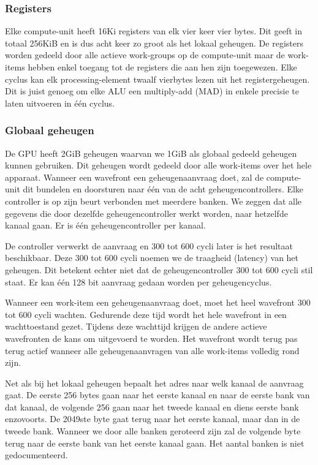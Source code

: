 \subsubsection{Registers}
Elke compute-unit heeft 16Ki registers van elk vier keer vier bytes. Dit geeft in totaal 256KiB en is dus acht keer zo groot als het lokaal geheugen. De registers worden gedeeld door alle actieve work-groups op de compute-unit maar de work-items hebben enkel toegang tot de registers die aan hen zijn toegewezen. Elke cyclus kan elk processing-element twaalf vierbytes lezen uit het registergeheugen. Dit is juist genoeg om elke ALU een multiply-add (MAD) in enkele precisie te laten uitvoeren in \'e\'en cyclus.

\subsubsection{Globaal geheugen}
De GPU heeft 2GiB geheugen waarvan we 1GiB als globaal gedeeld geheugen kunnen gebruiken. Dit geheugen wordt gedeeld door alle work-items over het hele apparaat. Wanneer een wavefront een geheugenaanvraag doet, zal de compute-unit dit bundelen en doorsturen naar \'e\'en van de acht geheugencontrollers. Elke controller is op zijn beurt verbonden met meerdere banken. We zeggen dat alle gegevens die door dezelfde geheugencontroller werkt worden, naar hetzelfde kanaal gaan. Er is \'e\'en geheugencontroller per kanaal.

De controller verwerkt de aanvraag en 300 tot 600 cycli later is het resultaat beschikbaar. Deze 300 tot 600 cycli noemen we de traagheid (latency) van het geheugen. Dit betekent echter niet dat de geheugencontroller 300 tot 600 cycli stil staat. Er kan \'e\'en 128 bit aanvraag gedaan worden per geheugencyclus.

Wanneer een work-item een geheugenaanvraag doet, moet het heel wavefront 300 tot 600 cycli wachten. Gedurende deze tijd wordt het hele wavefront in een wachttoestand gezet. Tijdens deze wachttijd krijgen de andere actieve wavefronten de kans om uitgevoerd te worden. Het wavefront wordt terug pas terug actief wanneer alle geheugenaanvragen van alle work-items volledig rond zijn.

Net als bij het lokaal geheugen bepaalt het adres naar welk kanaal de aanvraag gaat. De eerste 256 bytes gaan naar het eerste kanaal en naar de eerste bank van dat kanaal, de volgende 256 gaan naar het tweede kanaal en diens eerste bank enzovoorts. De 2049ste byte gaat terug naar het eerste kanaal, maar dan in de tweede bank. Wanneer we door alle banken geroteerd zijn zal de volgende byte terug naar de eerste bank van het eerste kanaal gaan. Het aantal banken is niet gedocumenteerd.

